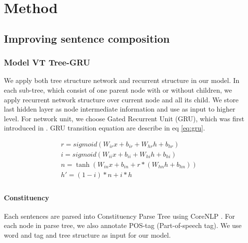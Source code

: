 \chapter{Method}


\section{Improving sentence composition}

\subsection{Model VT Tree-GRU}
We apply both tree structure network and recurrent structure in our model. In each sub-tree, which consist of one parent node with or without children, we apply recurrent network structure over current node and all its child. We store last hidden layer as node intermediate information and use as input to higher level. For network unit, we choose Gated Recurrent Unit (GRU), which was first introduced in \cite{cho2014learning}. GRU transition equation are describe in eq \ref{eq:gru}.

\begin{equation}
\label{eq:gru}
\begin{aligned}
&r = sigmoid(W_{ir} x + b_{ir} + W_{hr} h + b_{hr}) \\
&i = sigmoid(W_{ii} x + b_{ii} + W_{hi} h + b_{hi}) \\
&n = \tanh(W_{in} x + b_{in} + r * (W_{hn} h + b_{hn})) \\
&h' = (1 - i) * n + i * h\\
\end{aligned}
\end{equation}

\subsubsection{Constituency}
Each sentences are parsed into Constituency Parse Tree using CoreNLP \cite{manning2014stanford}. For each node in parse tree, we also annotate POS-tag (Part-of-speech tag). We use word and tag and tree structure as input for our model.

